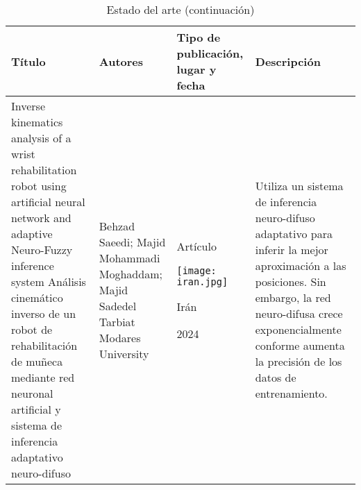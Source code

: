 \newpage
\begin{table}[htb]
	\caption{Estado del arte (continuación)}
	\centering
	\begin{tabular}{p{5cm}p{4cm}p{3.6cm}p{4cm}}
		\textbf{Título} & \textbf{Autores} & \textbf{Tipo de publicación, lugar y fecha} & \textbf{Descripción} \\ 
		\midrule
		Inverse kinematics analysis of a wrist rehabilitation robot using artificial neural network and adaptive Neuro-Fuzzy inference system \cite{estado3} \newline\newline
		Análisis cinemático inverso de un robot de rehabilitación de muñeca mediante red neuronal artificial y sistema de inferencia adaptativo neuro-difuso &  
		Behzad Saeedi; Majid Mohammadi Moghaddam; Majid Sadedel \newline\newline 
		Tarbiat Modares University & 
		\begin{center}Artículo \par \texttt{[image: iran.jpg]} \par Irán \par 2024\end{center} & 
		Utiliza un sistema de inferencia neuro-difuso adaptativo para inferir la mejor aproximación a las posiciones. \newline\newline Sin embargo, la red neuro-difusa crece exponencialmente conforme aumenta la precisión de los datos de entrenamiento. \\
	\end{tabular}
\end{table}